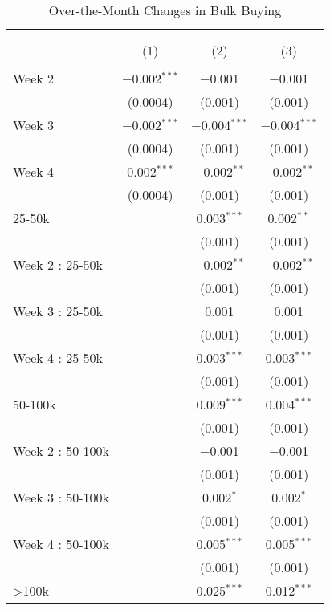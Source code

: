 
\begin{table}[!htbp] \centering 
  \caption{Over-the-Month Changes in Bulk Buying} 
  \label{tab:discountingBehaviorLiquidity} 
\begin{tabular}{@{\extracolsep{5pt}}lccc} 
\\[-1.8ex]\hline 
\hline \\[-1.8ex] 
\\[-1.8ex] & (1) & (2) & (3)\\ 
\hline \\[-1.8ex] 
 Week 2 & $-$0.002$^{***}$ & $-$0.001 & $-$0.001 \\ 
  & (0.0004) & (0.001) & (0.001) \\ 
  Week 3 & $-$0.002$^{***}$ & $-$0.004$^{***}$ & $-$0.004$^{***}$ \\ 
  & (0.0004) & (0.001) & (0.001) \\ 
  Week 4 & 0.002$^{***}$ & $-$0.002$^{**}$ & $-$0.002$^{**}$ \\ 
  & (0.0004) & (0.001) & (0.001) \\ 
  25-50k &  & 0.003$^{***}$ & 0.002$^{**}$ \\ 
  &  & (0.001) & (0.001) \\ 
  Week 2 : 25-50k &  & $-$0.002$^{**}$ & $-$0.002$^{**}$ \\ 
  &  & (0.001) & (0.001) \\ 
  Week 3 : 25-50k &  & 0.001 & 0.001 \\ 
  &  & (0.001) & (0.001) \\ 
  Week 4 : 25-50k &  & 0.003$^{***}$ & 0.003$^{***}$ \\ 
  &  & (0.001) & (0.001) \\ 
  50-100k &  & 0.009$^{***}$ & 0.004$^{***}$ \\ 
  &  & (0.001) & (0.001) \\ 
  Week 2 : 50-100k &  & $-$0.001 & $-$0.001 \\ 
  &  & (0.001) & (0.001) \\ 
  Week 3 : 50-100k &  & 0.002$^{*}$ & 0.002$^{*}$ \\ 
  &  & (0.001) & (0.001) \\ 
  Week 4 : 50-100k &  & 0.005$^{***}$ & 0.005$^{***}$ \\ 
  &  & (0.001) & (0.001) \\ 
  >100k &  & 0.025$^{***}$ & 0.012$^{***}$ \\ 

\end{tabular}
\end{table}
